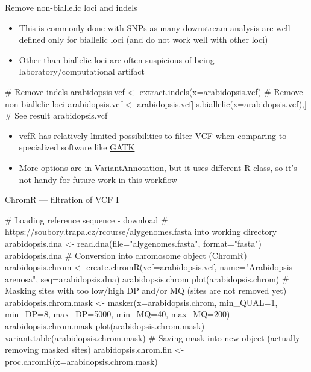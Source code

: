 \documentclass[compress, xelatex, 11pt, xcolor=svgnames, aspectratio=169, url={hyphens, lowtilde}]{beamer}
\begin{document}
\begin{frame}[fragile]{Remove non-biallelic loci and indels}
	\begin{itemize}
		\item This is commonly done with SNPs as many downstream analysis are well defined only for biallelic loci (and do not work well with other loci)
		\item Other than biallelic loci are often suspicious of being laboratory/computational artifact
	\end{itemize}
	\begin{spluscode}
    # Remove indels
    arabidopsis.vcf <- extract.indels(x=arabidopsis.vcf)
    # Remove non-biallelic loci
    arabidopsis.vcf <- arabidopsis.vcf[is.biallelic(x=arabidopsis.vcf),]
    # See result
    arabidopsis.vcf
	\end{spluscode}
	\begin{itemize}
		\item vcfR has relatively limited possibilities to filter VCF when comparing to specialized software like \href{https://gatk.broadinstitute.org/}{GATK}
		\item More options are in \href{https://bioconductor.org/packages/release/bioc/html/VariantAnnotation.html}{VariantAnnotation}, but it uses different R class, so it's not handy for future work in this workflow
	\end{itemize}
\end{frame}

\begin{frame}[fragile]{ChromR --- filtration of VCF I}
	\begin{spluscode}
    # Loading reference sequence - download
    # https://soubory.trapa.cz/rcourse/alygenomes.fasta into working directory
    arabidopsis.dna <- read.dna(file="alygenomes.fasta", format="fasta")
    arabidopsis.dna
    # Conversion into chromosome object (ChromR)
    arabidopsis.chrom <- create.chromR(vcf=arabidopsis.vcf,
      name="Arabidopsis arenosa", seq=arabidopsis.dna)
    arabidopsis.chrom
    plot(arabidopsis.chrom)
    # Masking sites with too low/high DP and/or MQ (sites are not removed yet)
    arabidopsis.chrom.mask <- masker(x=arabidopsis.chrom, min_QUAL=1,
      min_DP=8, max_DP=5000, min_MQ=40, max_MQ=200)
    arabidopsis.chrom.mask
    plot(arabidopsis.chrom.mask)
    variant.table(arabidopsis.chrom.mask)
    # Saving mask into new object (actually removing masked sites)
    arabidopsis.chrom.fin <- proc.chromR(x=arabidopsis.chrom.mask)
	\end{spluscode}
\end{frame}
\end{document}
